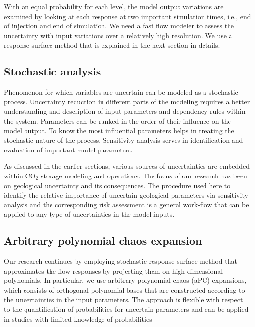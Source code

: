 With an equal probability for each level, the model output variations are
examined by looking at each response at two important simulation times, i.e., end of injection and end of simulation. We need a fast flow modeler to assess the uncertainty with input variations over a relatively high resolution. We use a response surface method that is explained in the next section in details. 

\subsection{Stochastic analysis}

Phenomenon for which variables are uncertain can be modeled as a stochastic process. Uncertainty reduction in different parts of the modeling requires a better understanding and description of input parameters and dependency rules within
the system. Parameters can be ranked in the order of their influence on the
model output. To know the most influential parameters helps in treating the
stochastic nature of the process. Sensitivity analysis serves in identification and evaluation of important model
parameters. 

As discussed in the earlier sections, various sources of uncertainties are
embedded within $\mbox{CO}_{2}$ storage modeling and operations. The focus of
our research has been on geological uncertainty and its consequences. The
procedure used here to identify the relative importance of uncertain geological
parameters via sensitivity analysis and the corresponding risk assessment is a
general work-flow that can be applied to any type of uncertainties in the model
inputs.

\subsection{Arbitrary polynomial chaos expansion}

Our research continues by employing stochastic response surface method that approximates the flow responses by projecting them on high-dimensional
polynomials. In particular, we use arbitrary polynomial chaos (aPC) expansions, which consists of orthogonal polynomial bases that are constructed  according
to the uncertainties in the input parameters. The approach is flexible with
respect to the quantification of probabilities for uncertain parameters and can
be applied in studies with limited knowledge of probabilities. 

